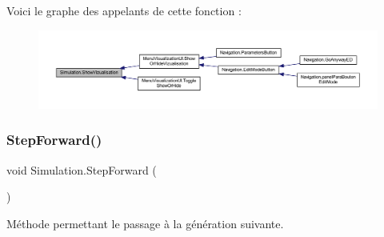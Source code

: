 Voici le graphe des appelants de cette fonction \+:
\nopagebreak
\begin{figure}[H]
\begin{center}
\leavevmode
\includegraphics[width=350pt]{class_simulation_acc3c641f3874f1805c3a13d2153b6023_icgraph}
\end{center}
\end{figure}
\mbox{\label{class_simulation_a1ba6581d305c2d60d174e0cffd917719}} 
\subsubsection{\texorpdfstring{Step\+Forward()}{StepForward()}}
{\footnotesize\ttfamily void Simulation.\+Step\+Forward (\begin{DoxyParamCaption}{ }\end{DoxyParamCaption})\hspace{0.3cm}{\ttfamily [inline]}}



Méthode permettant le passage à la génération suivante. 

